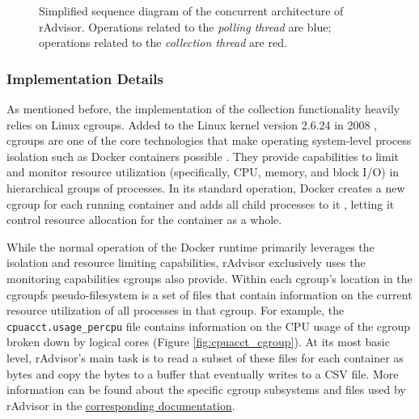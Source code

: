 \documentclass[a4paper,11pt]{article}
\newcommand{\filepath}[1]{\texttt{#1}\xspace}
\begin{document}
\newcommand{\polling}{seablue}
\newcommand{\collection}{cardinalred}
\begin{figure}[h]
    \centering
    
    \vspace{-0.5em}
    \caption{
        Simplified sequence diagram of the concurrent architecture of rAdvisor.
        Operations related to the \textit{polling thread} are \textcolor{\polling}{blue};
        operations related to the \textit{collection thread} are \textcolor{\collection}{red}.
    }
    \label{fig:radvisor_sequence}
    \vspace{1em}
\end{figure}

\subsubsection{Implementation Details}

As mentioned before, the implementation of the collection functionality heavily relies on Linux cgroups.
Added to the Linux kernel version 2.6.24 in 2008 \cite{CgroupsVer},
cgroups are one of the core technologies that make operating system-level process isolation
such as Docker containers possible \cite{Cgroups}.
They provide capabilities to limit and monitor resource utilization
(specifically, CPU, memory, and block I/O) \cite{DockerCgroups}
in hierarchical groups of processes.
In its standard operation, Docker creates a new cgroup for each running container
and adds all child processes to it \cite{DockerCgroups},
letting it control resource allocation for the container as a whole.

While the normal operation of the Docker runtime primarily leverages the isolation and resource limiting capabilities,
rAdvisor exclusively uses the monitoring capabilities cgroups also provide.
Within each cgroup's location in the cgroupfs pseudo-filesystem
is a set of files that contain information on the current resource utilization of all processes in that cgroup.
For example, the \filepath{cpuacct.usage\_percpu} file contains information on the CPU usage of the cgroup
broken down by logical cores (Figure \ref{fig:cpuacct_cgroup}).
At its most basic level, rAdvisor's main task is to read a subset of these files
for each container as bytes and copy the bytes to a buffer that eventually writes to a CSV file.
More information can be found about the specific cgroup subsystems and files used by rAdvisor
in the \href{https://github.com/elba-docker/radvisor/blob/494d65bd55432a67b151972d3bfb675069d017e5/docs/collecting.md}{corresponding documentation}.
\end{document}
